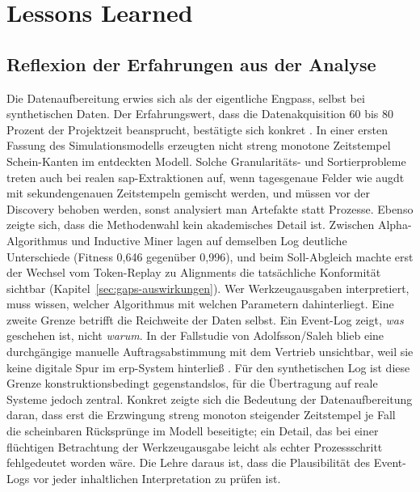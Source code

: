\chapter{Lessons Learned}\label{ch:lessons}


\section{Reflexion der Erfahrungen aus der Analyse}\label{sec:reflexion-erfahrungen}

Die Datenaufbereitung erwies sich als der eigentliche Engpass, selbst bei synthetischen Daten. Der Erfahrungswert, dass die Datenakquisition 60 bis 80 Prozent der Projektzeit beansprucht, bestätigte sich konkret \parencite[Folie~414]{coletta2026_3006}. In einer ersten Fassung des Simulationsmodells erzeugten nicht streng monotone Zeitstempel Schein-Kanten im entdeckten Modell. Solche Granularitäts- und Sortierprobleme treten auch bei realen \gls{sap}-Extraktionen auf, wenn tagesgenaue Felder wie \gls{augdt} mit sekundengenauen Zeitstempeln gemischt werden, und müssen vor der Discovery behoben werden, sonst analysiert man Artefakte statt Prozesse. Ebenso zeigte sich, dass die Methodenwahl kein akademisches Detail ist. Zwischen Alpha-Algorithmus und Inductive Miner lagen auf demselben Log deutliche Unterschiede (Fitness 0,646 gegenüber 0,996), und beim Soll-Abgleich machte erst der Wechsel vom Token-Replay zu Alignments die tatsächliche Konformität sichtbar (Kapitel~\ref{sec:gaps-auswirkungen}). Wer Werkzeugausgaben interpretiert, muss wissen, welcher Algorithmus mit welchen Parametern dahinterliegt. Eine zweite Grenze betrifft die Reichweite der Daten selbst. Ein Event-Log zeigt, \emph{was} geschehen ist, nicht \emph{warum}. In der Fallstudie von Adolfsson/Saleh blieb eine durchgängige manuelle Auftragsabstimmung mit dem Vertrieb unsichtbar, weil sie keine digitale Spur im \gls{erp}-System hinterließ \parencite[S.~50 und 62]{adolfsson2026o2c}. Für den synthetischen Log ist diese Grenze konstruktionsbedingt gegenstandslos, für die Übertragung auf reale Systeme jedoch zentral. Konkret zeigte sich die Bedeutung der Datenaufbereitung daran, dass erst die Erzwingung streng monoton steigender Zeitstempel je Fall die scheinbaren Rücksprünge im Modell beseitigte; ein Detail, das bei einer flüchtigen Betrachtung der Werkzeugausgabe leicht als echter Prozessschritt fehlgedeutet worden wäre. Die Lehre daraus ist, dass die Plausibilität des Event-Logs vor jeder inhaltlichen Interpretation zu prüfen ist.



